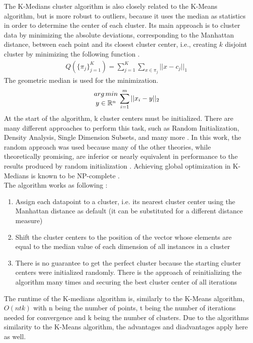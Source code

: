 The K-Medians cluster algorithm is also closely related to the K-Means algorithm, but is more robust to outliers, because it uses the median as statistics in order to determine the center of each cluster. Its main approach is to cluster data by minimizing the absolute deviations, corresponding to the Manhattan distance, between each point and its closest cluster center, i.e., creating $k$ disjoint cluster by minimizing the following function \cite{kmed}.
\begin{align}
    Q(\{\pi_j\}^K_{j=1}) = \sum_{j=1}^{K}\sum_{x \in \pi_j}||x-c_j||_1
\end{align}
The geometric median is used for the minimization.
\begin{align}
    {{arg\, min}\atop{y\in\mathbb{R}^n}} \sum_{i=1}^m ||x_i-y||_2
\end{align}
At the start of the algorithm, k cluster centers must be initialized. There are many different approaches to perform this task, such as Random Initialization, Density Analysis, Single Dimension Subsets, and many more \cite{kmed}. In this work, the random approach was used because many of the other theories, while theoretically promising, are inferior or nearly equivalent in performance to the results produced by random initialization \cite{kmed}. Achieving global optimization in K-Medians is known to be NP-complete \cite{kmed_time}.\\ 
The algorithm works as following \cite{algo_kmed}:
\begin{enumerate}
    \item Assign each datapoint to a cluster, i.e. its nearest cluster center using the Manhattan distance as default (it can be substituted for a different distance measure) 
    \item Shift the cluster centers to the position of the vector whose elements are equal to the median value of each dimension of all instances in a cluster
    \item There is no guarantee to get the perfect cluster because the starting cluster centers were initialized randomly. There is the approach of reinitializing the algorithm many times and securing the best cluster center of all iterations
\end{enumerate}
The runtime of the K-medians algorithm is, similarly to the K-Means algorithm, $O(ntk)$ with n being the number of points, t being the number of iterations needed for convergence and k being the number of clusters. Due to the algorithms similarity to the K-Means algorithm, the advantages and diadvantages apply here as well.\\
